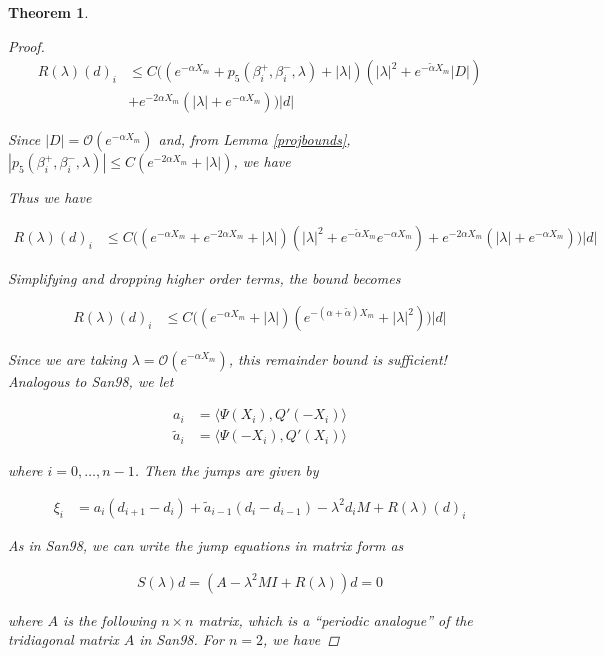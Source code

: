 \documentclass[12pt]{article}
\newtheorem{theorem}{Theorem}
\begin{document}
\begin{theorem}
\begin{proof}
\begin{align*}
R(\lambda)(d)_i &\leq C \Big( ( e^{-\alpha X_m} + p_5(\beta_i^+, \beta_i^-, \lambda) + |\lambda|  )(|\lambda|^2 + e^{-\tilde{\alpha}X_m} |D|) \\
&+ e^{-2 \alpha X_m} ( |\lambda| +  e^{-\alpha X_m} ) \Big) |d|
\end{align*}

Since $|D| = \mathcal{O}(e^{-\alpha X_m})$ and, from Lemma \ref{projbounds}, 
$|p_5(\beta_i^+, \beta_i^-, \lambda)| \leq C( e^{-2 \alpha X_m} + |\lambda|)$, we have

Thus we have

\begin{align*}
R(\lambda)(d)_i &\leq C \Big( ( e^{-\alpha X_m} +  e^{-2 \alpha X_m} + |\lambda|  )(|\lambda|^2 + e^{-\tilde{\alpha}X_m} e^{-\alpha X_m}) + e^{-2 \alpha X_m} ( |\lambda| +  e^{-\alpha X_m} ) \Big) |d|
\end{align*}

Simplifying and dropping higher order terms, the bound becomes

\begin{align*}
R(\lambda)(d)_i &\leq C \Big( ( e^{-\alpha X_m} + |\lambda|  )(e^{-(\alpha + \tilde{\alpha})X_m} + |\lambda|^2 ) \Big) |d|
\end{align*}

Since we are taking $\lambda = \mathcal{O}(e^{-\alpha X_m})$, this remainder bound is sufficient!\\

Analogous to San98, we let

\begin{align*}
a_i &= \langle \Psi(X_i), Q'(-X_i) \rangle \\
\tilde{a}_i &= \langle \Psi(-X_i), Q'(X_i) \rangle
\end{align*}

where $i = 0, \dots, n-1$. Then the jumps are given by 

\begin{align*}
\xi_i &= a_i (d_{i+1} - d_i ) + \tilde{a}_{i-1} (d_i - d_{i-1} ) - \lambda^2 d_i M + R(\lambda)(d)_i
\end{align*}

As in San98, we can write the jump equations in matrix form as 

\begin{align*}
S(\lambda)d = (A - \lambda^2 MI + R(\lambda))d = 0
\end{align*}

where $A$ is the following $n \times n$ matrix, which is a ``periodic analogue'' of the tridiagonal matrix $A$ in San98. For $n = 2$, we have


\end{proof}
\end{theorem}
\end{document}
